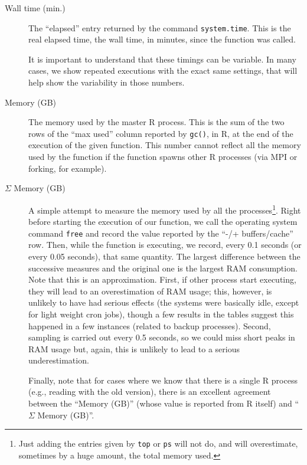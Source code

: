 \documentclass[a4paper,11pt]{article}
\begin{document}
\begin{description}

\item[Wall time (min.)] The ``elapsed'' entry returned by the command
  \texttt{system.time}. This is the real elapsed time, the wall time, in
  minutes, since the function was called.
  
  It is important to understand that these timings can be variable. In
  many cases, we show repeated executions with the exact same settings,
  that will help show the variability in those numbers.

\item[Memory (GB)] The memory used by the master R process. This is the
  sum of the two rows of the ``max used'' column reported by
  \texttt{gc()}, in R, at the end of the execution of the given
  function. This number cannot reflect all the memory used by the function
  if the function spawns other R processes (via MPI or forking, for
  example).

\item[$\Sigma$ Memory (GB)] A simple attempt to measure the memory used by
  all the processes\footnote{Just adding the entries given by \texttt{top}
    or \texttt{ps} will not do, and will overestimate, sometimes by a huge
    amount, the total memory used.}. Right before starting the execution
  of our function, we call the operating system command \texttt{free} and
  record the value reported by the ``-/+ buffers/cache'' row. Then, while
  the function is executing, we record, every 0.1 seconds (or every 0.05
  seconds), that same quantity. The largest difference between the
  successive measures and the original one is the largest RAM
  consumption. Note that this is an approximation. First, if other process
  start executing, they will lead to an overestimation of RAM usage; this,
  however, is unlikely to have had serious effects (the systems were
  basically idle, except for light weight cron jobs), though a few results
  in the tables suggest this happened in a few instances (related to
  backup processes). Second, sampling is carried out every 0.5 seconds, so
  we could miss short peaks in RAM usage but, again, this is unlikely to
  lead to a serious underestimation.

  Finally, note that for cases where we know that there is a single R
  process (e.g., reading with the old version), there is an excellent
  agreement between the ``Memory (GB)'' (whose value is reported from R
  itself) and ``$\Sigma$ Memory (GB)''. 
  

\end{description}
\end{document}
